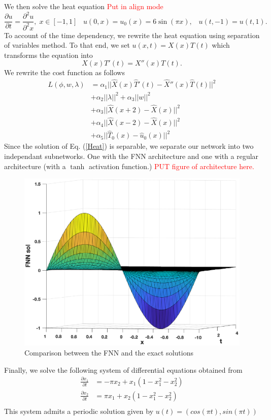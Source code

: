 \documentclass[11pt]{article}
\begin{document}
We then solve the heat equation \textcolor{red}{Put in align mode}
\begin{equation}\label{Heat}
    \frac{\partial u}{\partial t} = \frac{\partial^2 u}{\partial^2 x},\; x \in [-1,1] \;\;\; u(0,x) = u_0(x) = 6 \sin(\pi x), \;\;\; u(t, -1) = u(t, 1).
\end{equation}
To account of the time dependency, we rewrite the heat equation using separation of variables method. To that end, we set $u(x,t) = X(x)T(t)$ which transforms the equation into 
$$X(x)T'(t) = X''(x)T(t).$$
We rewrite the cost function as follows 
\begin{align*}
    L(\phi, w, \lambda) &= \alpha_1||\hat{X}(x)\hat{T}'(t)-\hat{X}''(x)\hat{T}(t)||^2  \\ &+\alpha_2||\lambda||^2 + \alpha_3||w||^2 \\ 
    &+\alpha_3 ||\hat{X}(x + 2) - \hat{X}(x)||^2 \\
    &+\alpha_4||\hat{X}(x - 2) - \hat{X}(x)||^2  \\
   &+ \alpha_5||\hat{T}_0(x) - \hat{u}_0(x)||^2
\end{align*}
Since the solution of Eq. (\ref{Heat}) is separable, we separate our network into two independant subnetworks. One with the FNN architecture and one with a regular architecture (with a $\tanh$ activation function.) \textcolor{red}{PUT figure of architecture here.}


  \begin{figure}[!htb]
    \centering
    \includegraphics[width=.8\textwidth]{NNheatsol.eps}
    \caption{Comparison between the FNN and the exact solutions}
    \label{fig:fourvsNNcompPer}
\end{figure}

Finally, we solve the following system of differential equations obtained from \cite{Teschl2012} 
\begin{align}
    \frac{\partial x_1}{\partial t} &= -\pi  x_2 + x_1(1 - x_1^2 - x_2^2) \nonumber \\ 
    \frac{\partial x_2}{\partial t} &= \pi  x_1 + x_2(1 - x_1^2 - x_2^2) \\
\end{align}\label{sys_per}
This system admits a periodic solution given by $u(t)=(cos(\pi t), sin(\pi t))$
\end{document}
